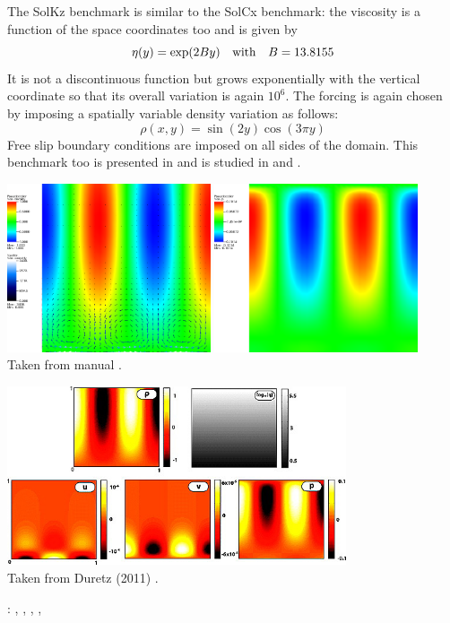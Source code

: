 

The SolKz benchmark is similar to the SolCx benchmark: 
the viscosity is a function of the space coordinates too and is given by 
\[
\eta(y)=\exp(2By) \quad {\rm with} \quad B=13.8155
\]
It is not a discontinuous function but grows exponentially with the 
vertical coordinate so that its overall variation is again $10^6$. 
The forcing is again chosen by imposing a spatially variable density variation as follows:
\[
\rho(x,y)=\sin(2y) \cos(3\pi y)
\]
Free slip boundary conditions are imposed on all sides of the domain.
This benchmark too is presented in \cite{zhon96} and is studied in \cite{dumg11} and \cite{gemd13}.

\begin{center}
\includegraphics[width=6cm]{images/benchmark_solkz/solkz-solution}
\includegraphics[width=6cm]{images/benchmark_solkz/solkz-solution-pressure}\\
{\captionfont Taken from \aspect manual \cite{aspectmanual}.}
\end{center}


\begin{center}
\includegraphics[width=10cm]{images/benchmark_solkz/dumg11}\\
{\captionfont Taken from Duretz \etal (2011) \cite{dumg11}.}
\end{center}

\Literature: \cite{mozg96}, \cite{mamo08}, \cite{vemmXX}, \cite{demh19}, \cite{repa87}
